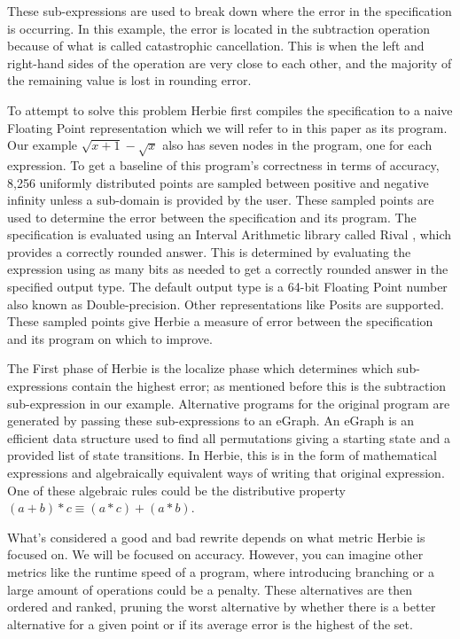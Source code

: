 \documentclass{article}
\begin{document}
These sub-expressions are used to break down where the error in the specification is occurring. In this example, the error is located in the subtraction operation because of what is called catastrophic cancellation. This is when the left and right-hand sides of the operation are very close to each other, and the majority of the remaining value is lost in rounding error. 

To attempt to solve this problem Herbie first compiles the specification to a naive Floating Point representation which we will refer to in this paper as its program. Our example $\sqrt{x + 1} - \sqrt{x}$ also has seven nodes in the program, one for each expression. To get a baseline of this program's correctness in terms of accuracy, 8,256 uniformly distributed points are sampled between positive and negative infinity unless a sub-domain is provided by the user. These sampled points are used to determine the error between the specification and its program. The specification is evaluated using an Interval Arithmetic library called Rival \cite{Rival}, which provides a correctly rounded answer. This is determined by evaluating the expression using as many bits as needed to get a correctly rounded answer in the specified output type. The default output type is a 64-bit Floating Point number also known as Double-precision. Other representations like Posits \cite{Posit} are supported. These sampled points give Herbie a measure of error between the specification and its program on which to improve. 

The First phase of Herbie is the localize phase which determines which sub-expressions contain the highest error; as mentioned before this is the subtraction sub-expression in our example. Alternative programs for the original program are generated by passing these sub-expressions to an eGraph. An eGraph is an efficient data structure used to find all permutations giving a starting state and a provided list of state transitions. In Herbie, this is in the form of mathematical expressions and algebraically equivalent ways of writing that original expression. One of these algebraic rules could be the distributive property $(a +b) * c \equiv (a * c) + ( a * b)$. 

What's considered a good and bad rewrite depends on what metric Herbie is focused on. We will be focused on accuracy. However, you can imagine other metrics like the runtime speed of a program, where introducing branching or a large amount of operations could be a penalty. These alternatives are then ordered and ranked, pruning the worst alternative by whether there is a better alternative for a given point or if its average error is the highest of the set.
\end{document}
